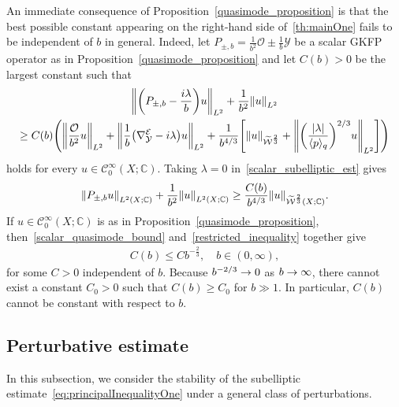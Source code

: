 \documentclass[AHL,Unicode,longabstracts]{cedram}
\newcommand{\C}{\mathbb{C}}
\newcommand{\clW}{\mathcal{W}}
\newcommand{\clC}{\mathcal{C}}
\newcommand{\clY}{\mathcal{Y}}
\newcommand{\clO}{\mathcal{O}}
\newcommand{\clE}{\mathcal{E}}
\newcommand{\abs}[1]{\left| #1 \right|}
\newcommand\norm[1]{\left\lVert#1\right\rVert}
\let\originalleft\left
\let\originalright\right
\renewcommand{\left}{\mathopen{}\mathclose\bgroup\originalleft}
\renewcommand{\right}{\aftergroup\egroup\originalright}
\renewcommand*{\to}{\mathchoice{\longrightarrow}{\rightarrow}{\rightarrow}{\rightarrow}}
\begin{document}
An immediate consequence of Proposition~\ref{quasimode_proposition} is that the best possible constant appearing on the right-hand side of~\eqref{th:mainOne} fails to be independent of $b$ in general. Indeed, let $P_{\pm,b} = \frac{1}{b^2} \clO\pm \frac{1}{b} \clY$ be a scalar GKFP operator as in Proposition~\ref{quasimode_proposition} and let $C(b)>0$ be the largest constant such that
\begin{multline}\label{scalar_subelliptic_est}
\left\| \left(P_{\pm,b} - \frac{i\lambda}{b}\right)u\right\|_{L^{2}}+\frac{1}{b^2}\norm{u}_{L^2} \\
\geq C(b)
\Bigg(\left\| \frac{\clO}{b^{2}}u \right\|_{L^{2}} +
\left\|
\frac{1}{b}\left(\nabla^{\clE}_{\clY} - i\lambda \right)u
\right\|_{L^{2}}
+ \frac{1}{b^{4/3}}\left[\|u\|_{\widetilde{\clW}^{\frac{2}{3}}} + \norm{\left(\frac{\abs{\lambda}}{\langle p \rangle_q} \right)^{2/3} u}_{L^2}\right]
\Bigg)
\end{multline}
holds for every $u\in \clC^\infty_{0}(X; \C)$. Taking $\lambda = 0$ in~\eqref{scalar_subelliptic_est} gives
\begin{equation}\label{restricted_inequality}
\norm{P_{\pm,b} u}_{L^2(X;\C)} + \frac{1}{b^2} \norm{u}_{L^2(X;\C)} \ge \frac{C(b)}{b^{4/3}} \norm{u}_{\widetilde{\clW}^{\frac{2}{3}}(X;\C)}.
\end{equation}
If $u \in \clC^\infty_{0}(X; \C)$ is as in Proposition~\ref{quasimode_proposition}, then~\eqref{scalar_quasimode_bound} and~\eqref{restricted_inequality} together give
\begin{align}
C(b) \le C b^{-\frac{2}{3}}, \quad b \in (0,\infty),
\end{align}
for some $C>0$ independent of $b$. Because $b^{-2/3} \to 0$ as $b \to \infty$, there cannot exist a constant $C_0>0$ such that $C(b) \ge C_0$ for $b \gg 1$. In particular, $C(b)$ cannot be constant with respect to $b$.

\subsection{Perturbative estimate}\label{sec:perturb}
In this subsection, we consider the stability of the subelliptic estimate~\eqref{eq:principalInequalityOne} under a general class of perturbations.
\end{document}
